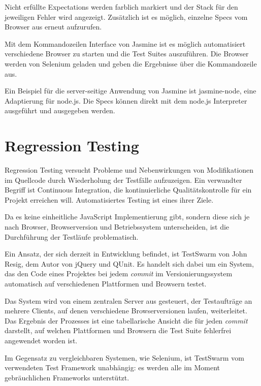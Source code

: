 \documentclass[11pt, a4paper]{article}
\begin{document}
Nicht erfüllte Expectations werden farblich markiert und der Stack für den
jeweiligen Fehler wird angezeigt. Zusätzlich ist es möglich, einzelne Specs vom
Browser aus erneut aufzurufen.

Mit dem Kommandozeilen Interface von Jasmine ist es möglich automatisiert
verschiedene Browser zu starten und die Test Suites auszuführen. Die Browser
werden von Selenium\cite{selenium_selenium_2011} geladen und geben die
Ergebnisse über die Kommandozeile aus.

Ein Beispiel für die server-seitige Anwendung von Jasmine ist
jasmine-node\cite{hevery_jasmine-node_2011}, eine Adaptierung für node.js. Die
Specs können direkt mit dem node.js Interpreter ausgeführt und ausgegeben
werden.

\section{Regression Testing}

Regression Testing\cite{wikipedia_regression_2011} versucht Probleme und
Nebenwirkungen von Modifikationen im Quellcode durch Wiederholung der Testfälle
aufzuzeigen. Ein verwandter Begriff ist Continuous
Integration\cite{wikipedia_continuous_2011}, die kontinuierliche
Qualitätskontrolle für ein Projekt erreichen will. Automatisiertes Testing ist
eines ihrer Ziele. 

Da es keine einheitliche JavaScript Implementierung gibt, sondern
diese sich je nach Browser, Browserversion und Betriebssystem unterscheiden, ist
die Durchführung der Testläufe problematisch.

Ein Ansatz, der sich derzeit in Entwicklung befindet, ist
TestSwarm\cite{resig_testswarm_2011} von John Resig, dem Autor von jQuery und
QUnit. Es handelt sich dabei um ein System, das den Code eines Projektes bei
jedem \emph{commit} im Versionierungssystem automatisch auf verschiedenen
Plattformen und Browsern testet.

Das System wird von einem zentralen Server aus gesteuert, der Testaufträge an
mehrere Clients, auf denen verschiedene Browserversionen laufen, weiterleitet.
Das Ergebnis der Prozesses ist eine tabellarische Ansicht die für jeden
\emph{commit} darstellt, auf welchen Plattformen und Browsern die Test Suite
fehlerfrei angewendet worden ist.

Im Gegensatz zu vergleichbaren Systemen, wie
Selenium\cite{selenium_selenium_2011}, ist TestSwarm vom verwendeten Test
Framework unabhängig: es werden alle im Moment gebräuchlichen Frameworks
unterstützt.

\clearpage

\begin{flushleft}
  
  
\end{flushleft}
\end{document}
